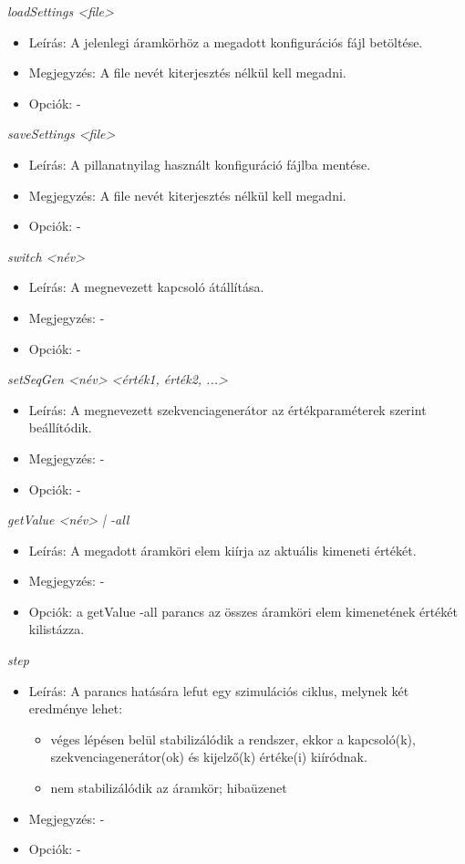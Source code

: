 \textit{loadSettings <file>}
\begin{itemize}
	\item Leírás: A jelenlegi áramkörhöz a megadott konfigurációs fájl betöltése.
	\item Megjegyzés: A file nevét kiterjesztés nélkül kell megadni.
	\item Opciók: -
\end{itemize}

\textit{saveSettings <file>}
\begin{itemize}
	\item Leírás: A pillanatnyilag használt konfiguráció fájlba mentése.
	\item Megjegyzés: A file nevét kiterjesztés nélkül kell megadni.
	\item Opciók: -
\end{itemize}

\textit{switch <név>}
\begin{itemize}
	\item Leírás: A megnevezett kapcsoló átállítása.
	\item Megjegyzés: -
	\item Opciók: -
\end{itemize}

\textit{setSeqGen <név> <érték1, érték2, ...>}
\begin{itemize}
	\item Leírás: A megnevezett szekvenciagenerátor az értékparaméterek szerint beállítódik.
	\item Megjegyzés: -
	\item Opciók: -
\end{itemize}

\textit{getValue <név> | -all}
\begin{itemize}
	\item Leírás: A megadott áramköri elem kiírja az aktuális kimeneti értékét.
	\item Megjegyzés: -
	\item Opciók: a getValue -all parancs az összes áramköri elem kimenetének értékét kilistázza.
\end{itemize}

\textit{step}
\begin{itemize}
	\item Leírás: A parancs hatására lefut egy szimulációs ciklus, melynek két eredménye lehet:
	\begin{itemize}
		\item véges lépésen belül stabilizálódik a rendszer, ekkor a kapcsoló(k), szekvenciagenerátor(ok) és kijelző(k) értéke(i) kiíródnak.
		\item nem stabilizálódik az áramkör; hibaüzenet
	\end{itemize}
	\item Megjegyzés: - 
	\item Opciók: -
\end{itemize}

